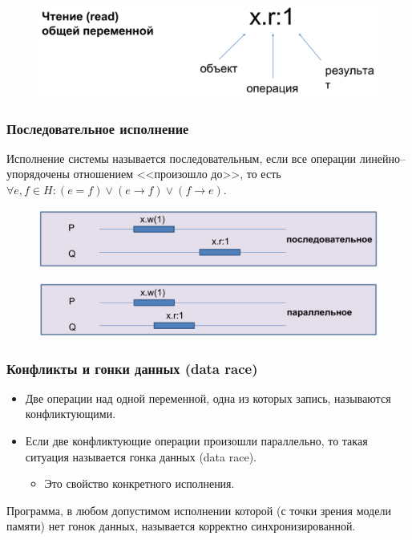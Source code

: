 \documentclass[10pt,a4paper,oneside,titlepage]{article}
\begin{document}
\begin{figure}
	\centering
	\includegraphics[width=0.7\linewidth]{pictures/Read}
	\caption{}
	\label{fig:read}
\end{figure}

\subsubsection{Последовательное исполнение}
Исполнение системы называется последовательным, если все операции линейно--упорядочены отношением <<произошло до>>, то есть $\forall e, f\in H\colon (e=f)\vee(e\to f)\vee(f\to e)$.

\begin{figure}
	\centering
	\includegraphics[width=0.2\linewidth]{pictures/Model4}
	\caption{}
	\label{fig:model4}
\end{figure}

\begin{figure}
	\centering
	\includegraphics[width=0.2\linewidth]{pictures/Model5}
	\caption{}
	\label{fig:model5}
\end{figure}

\subsubsection{Конфликты и гонки данных (data race)}
\begin{itemize}
	\item Две операции над одной переменной, одна из которых запись, называются конфликтующими.
	\item Если две конфликтующие операции произошли параллельно, то такая ситуация называется гонка данных (data race).
	\begin{itemize}
		\item Это свойство конкретного исполнения.
	\end{itemize}
\end{itemize}

Программа, в любом допустимом исполнении которой (с точки зрения модели памяти) нет гонок данных, называется корректно синхронизированной.
\end{document}
